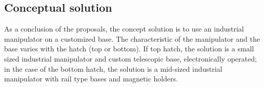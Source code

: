 \subsection{Conceptual solution}
As a conclusion of the proposals, the concept solution is to use an
industrial manipulator on a customized base. The characteristic of the
manipulator and the base varies with the hatch (top or bottom). If top hatch,
the solution is a small sized industrial manipulator and custom telescopic base, electronically
operated; in the case of the bottom hatch, the solution is a mid-sized industrial manipulator
with rail type bases and magnetic holders.

